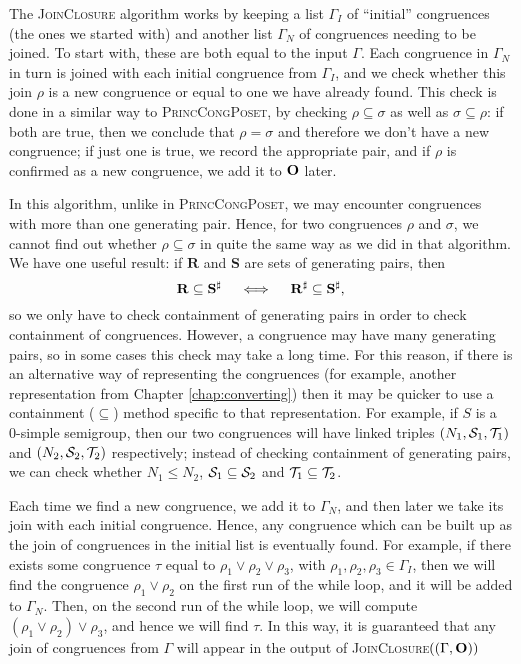 The \textsc{JoinClosure} algorithm works by keeping a list $\Gamma_I$ of
``initial'' congruences (the ones we started with) and another list $\Gamma_N$
of congruences needing to be joined.  To start with, these are both equal to the
input $\Gamma$.  Each congruence in $\Gamma_N$ in turn is joined with each
initial congruence from $\Gamma_I$, and we check whether this join $\rho$ is a
new congruence or equal to one we have already found.  This check is done in a
similar way to \textsc{PrincCongPoset}, by checking $\rho \subseteq \sigma$ as
well as $\sigma \subseteq \rho$: if both are true, then we conclude that
$\rho = \sigma$ and therefore we don't have a new congruence; if just one is
true, we record the appropriate pair, and if $\rho$ is confirmed as a new
congruence, we add it to $\mathbf{O}$ later.

In this algorithm, unlike in \textsc{PrincCongPoset}, we may encounter
congruences with more than one generating pair.  Hence, for two congruences
$\rho$ and $\sigma$, we cannot find out whether $\rho \subseteq \sigma$ in quite
the same way as we did in that algorithm.  We have one useful result: if
$\mathbf{R}$ and $\mathbf{S}$ are sets of generating pairs, then
$$\mathbf{R} \subseteq \mathbf{S}^\sharp \quad\iff\quad
\mathbf{R}^\sharp \subseteq \mathbf{S}^\sharp,$$
so we only have to check containment of generating pairs in order to check
containment of congruences.  However, a congruence may have many generating
pairs, so in some cases this check may take a long time.  For this reason, if
there is an alternative way of representing the congruences (for example,
another representation from Chapter \ref{chap:converting}) then it may be
quicker to use a containment ($\subseteq$) method specific to that
representation.  For example, if $S$ is a 0-simple semigroup, then our two
congruences will have linked triples $(N_1,\mathcal{S}_1,\mathcal{T}_1)$ and $(N_2,\mathcal{S}_2,\mathcal{T}_2)$
respectively; instead of checking containment of generating pairs, we can check
whether $N_1 \leq N_2$, $\mathcal{S}_1 \subseteq \mathcal{S}_2$ and $\mathcal{T}_1 \subseteq \mathcal{T}_2$.

Each time we find a new congruence, we add it to $\Gamma_N$, and then later we
take its join with each initial congruence.  Hence, any congruence which can be
built up as the join of congruences in the initial list is eventually found.
For example, if there exists some congruence $\tau$ equal to
$\rho_1 \vee \rho_2 \vee \rho_3$, with $\rho_1,\rho_2,\rho_3 \in \Gamma_I$, then
we will find the congruence $\rho_1 \vee \rho_2$ on the first run of the while
loop, and it will be added to $\Gamma_N$.  Then, on the second run of the while
loop, we will compute $(\rho_1 \vee \rho_2) \vee \rho_3$, and hence we will find
$\tau$.  In this way, it is guaranteed that any join of congruences from
$\Gamma$ will appear in the output of
\textsc{JoinClosure}$((\Gamma, \mathbf{O}))$

